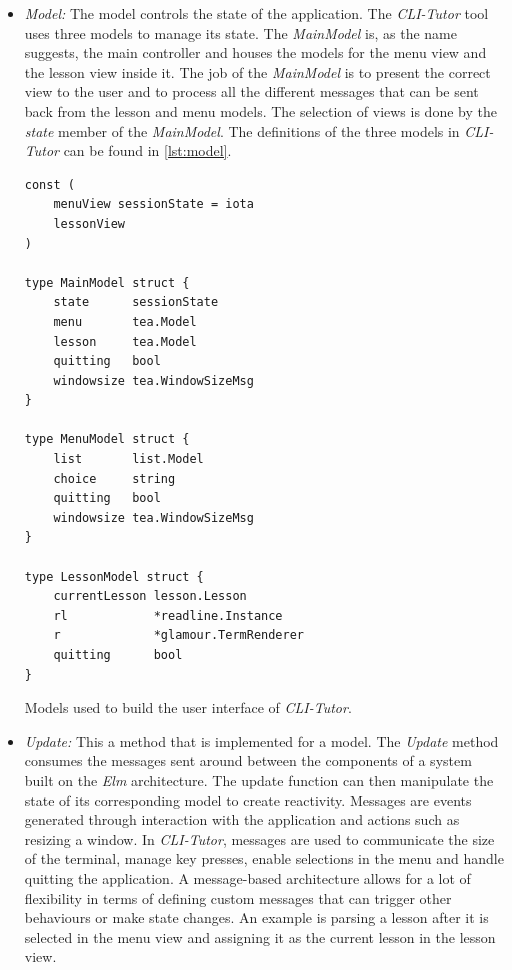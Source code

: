 \begin{itemize}
    \item \textit{Model:} The model controls the state of the application. The 
        \textit{CLI-Tutor} tool uses three models to manage its state. The
        \textit{MainModel} is, as the name suggests, the main controller and
        houses the models for the menu view and the lesson view inside it. The
        job of the \textit{MainModel} is to present the correct view to the
        user and to process all the different messages that can be sent back
        from the lesson and menu models. The selection of views is done by the \textit{state} member of the \textit{MainModel}.  The definitions of the three models in \textit{CLI-Tutor} can be found in \autoref{lst:model}.

\begin{listing}
\begin{verbatim}
const (
	menuView sessionState = iota
	lessonView
)

type MainModel struct {
	state      sessionState
	menu       tea.Model
	lesson     tea.Model
	quitting   bool
	windowsize tea.WindowSizeMsg
}

type MenuModel struct {
	list       list.Model
	choice     string
	quitting   bool
	windowsize tea.WindowSizeMsg
}

type LessonModel struct {
	currentLesson lesson.Lesson
	rl            *readline.Instance
	r             *glamour.TermRenderer
	quitting      bool
}
\end{verbatim}
    \caption{Models used to build the user interface of \textit{CLI-Tutor}.}
    \label{lst:model}
\end{listing}

\item \textit{Update:} This a method that is implemented for a model. The
    \textit{Update} method consumes the messages sent around between the
    components of a system built on the \textit{Elm} architecture. The update
    function can then manipulate the state of its corresponding model to create
    reactivity. Messages are events generated through interaction with the
    application and actions such as resizing a window. In \textit{CLI-Tutor},
    messages are used to communicate the size of the terminal, manage key
    presses, enable selections in the menu and handle quitting the application.
    A message-based architecture allows for a lot of flexibility in terms of
    defining custom messages that can trigger other behaviours or make state
    changes. An example is parsing a lesson after it is selected in the menu
    view and assigning it as the current lesson in the lesson view.


\end{itemize}
